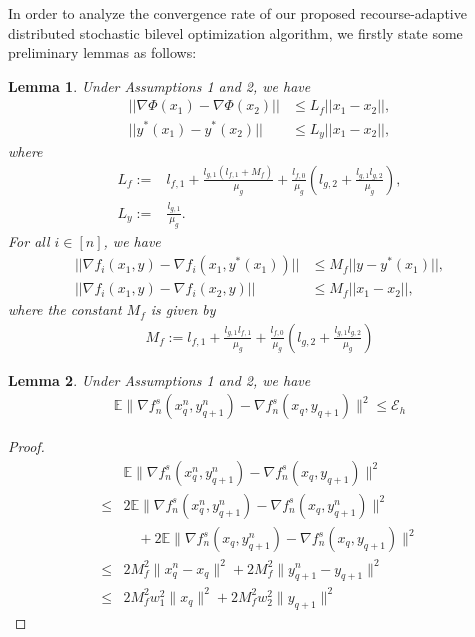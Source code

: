 \documentclass[lettersize,journal]{IEEEtran}
\newtheorem{lemma}{Lemma}
\begin{document}
In order to analyze the convergence rate of our proposed recourse-adaptive distributed stochastic bilevel optimization algorithm, we firstly state some preliminary lemmas as follows:

\begin{lemma}
Under Assumptions 1 and 2, we have 
\begin{align}
    ||\nabla \Phi(x_1) -\nabla \Phi(x_2)||&\leq L_f ||x_1 - x_2||,\label{eq:f_lip}\\
    ||y^*(x_1)-y^*(x_2)||&\leq L_y ||x_1-x_2||,
\end{align}
where 
\begin{align}
    L_f :=& l_{f,1}+\frac{l_{g,1}(l_{f,1}+M_f)}{\mu_g}+\frac{l_{f,0}}{\mu_g}(l_{g,2}+\frac{l_{g,1}l_{g,2}}{\mu_g}), \nonumber
    \\
    L_y :=& \frac{l_{g,1}}{\mu_g}.\nonumber
\end{align}
For all $i\in [n]$, we have 
\begin{align}
    ||\nabla f_i(x_1, y)-\nabla f_i(x_1,y^*(x_1))|| &\leq M_f ||y-y^*(x_1)||,\\
    ||\nabla f_i(x_1,y)-\nabla f_i(x_2,y)|| &\leq M_f||x_1-x_2||,
\end{align}
where the constant $M_f$ is given by 
\begin{align}
    M_f:=l_{f,1}+\frac{l_{g,1}l_{f,1}}{\mu_g}+\frac{l_{f,0}}{\mu_g}(l_{g,2}+\frac{l_{g,1}l_{g,2}}{\mu_g})\nonumber
\end{align}
\end{lemma}

\begin{lemma} Under Assumptions 1 and 2, we have 
\begin{align}\mathbb{E}\|\nabla f^s_n(x_{q}^n,y_{q+1}^n)-\nabla f^s_n(x_{q},y_{q+1})\|^2\leq \mathcal{E}_h\end{align}
\end{lemma}
\begin{proof}
\begin{align*}
    &\mathbb{E}\|\nabla f^s_n(x_{q}^n,y_{q+1}^n)-\nabla f^s_n(x_{q},y_{q+1})\|^2\\
    \leq&2\mathbb{E}\|\nabla f^s_n(x_{q}^n,y_{q+1}^n)-\nabla f^s_n(x_{q},y_{q+1}^n)\|^2\\&\quad+2\mathbb{E}\|\nabla f^s_n(x_{q},y_{q+1}^n)-\nabla f^s_n(x_{q},y_{q+1})\|^2\\
    \leq &2 M_f^2\|x_q^n-x_q\|^2+2M_f^2\|y_{q+1}^n-y_{q+1}\|^2 \\
    \leq &2M_f^2 w_1^2 \|x_q\|^2+2M_f^2 w_2^2 \|y_{q+1}\|^2
\end{align*}
\end{proof} 
\end{document}

